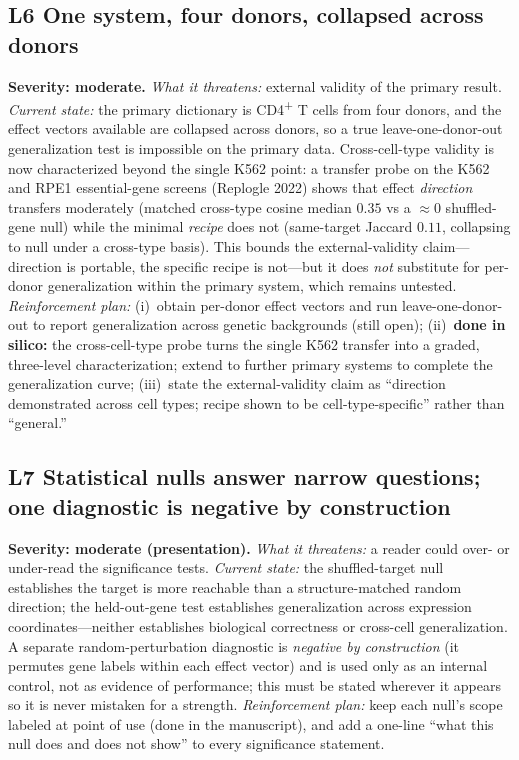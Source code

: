 \documentclass[11pt]{article}
\newcommand{\sev}[2]{\textcolor{#1}{\textbf{#2}}}
\begin{document}
\subsection{L6 \quad One system, four donors, collapsed across donors}
\sev{sev3}{Severity: moderate.}
\emph{What it threatens:} external validity of the primary result.
\emph{Current state:} the primary dictionary is CD4\textsuperscript{+} T cells from four donors,
and the effect vectors available are collapsed across donors, so a true leave-one-donor-out
generalization test is impossible on the primary data. Cross-cell-type validity is now
characterized beyond the single K562 point: a transfer probe on the K562 and RPE1 essential-gene
screens (Replogle 2022) shows that effect \emph{direction} transfers moderately (matched
cross-type cosine median $0.35$ vs a $\approx0$ shuffled-gene null) while the minimal
\emph{recipe} does not (same-target Jaccard $0.11$, collapsing to null under a cross-type basis).
This bounds the external-validity claim---direction is portable, the specific recipe is
not---but it does \emph{not} substitute for per-donor generalization within the primary system,
which remains untested.
\emph{Reinforcement plan:} (i)~obtain per-donor effect vectors and run leave-one-donor-out to
report generalization across genetic backgrounds (still open); (ii)~\sev{sev3}{done in silico:}
the cross-cell-type probe turns the single K562 transfer into a graded, three-level
characterization; extend to further primary systems to complete the generalization curve;
(iii)~state the external-validity claim as ``direction demonstrated across cell types; recipe
shown to be cell-type-specific'' rather than ``general.''

\subsection{L7 \quad Statistical nulls answer narrow questions; one diagnostic is negative by construction}
\sev{sev3}{Severity: moderate (presentation).}
\emph{What it threatens:} a reader could over- or under-read the significance tests.
\emph{Current state:} the shuffled-target null establishes the target is more reachable than a
structure-matched random direction; the held-out-gene test establishes generalization across
expression coordinates---neither establishes biological correctness or cross-cell
generalization. A separate random-perturbation diagnostic is \emph{negative by construction}
(it permutes gene labels within each effect vector) and is used only as an internal control, not
as evidence of performance; this must be stated wherever it appears so it is never mistaken for a
strength.
\emph{Reinforcement plan:} keep each null's scope labeled at point of use (done in the
manuscript), and add a one-line ``what this null does and does not show'' to every significance
statement.
\end{document}
